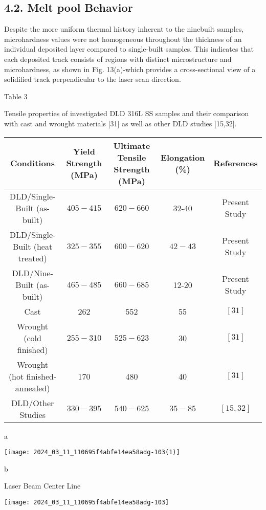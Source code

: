 \documentclass[10pt]{article}
\begin{document}
\subsection*{4.2. Melt pool Behavior}
Despite the more uniform thermal history inherent to the ninebuilt samples, microhardness values were not homogeneous throughout the thickness of an individual deposited layer compared to single-built samples. This indicates that each deposited track consists of regions with distinct microstructure and microhardness, as shown in Fig. 13(a)-which provides a cross-sectional view of a solidified track perpendicular to the laser scan direction.

Table 3

Tensile properties of investigated DLD 316L SS samples and their comparison with cast and wrought materials [31] as well as other DLD studies [15,32].

\begin{center}
\begin{tabular}{|c|c|c|c|c|}
\hline
Conditions & Yield Strength (MPa) & Ultimate Tensile Strength (MPa) & Elongation (\%) & References \\
\hline
DLD/Single-Built (as-built) & $405-415$ & $620-660$ & 32-40 & Present Study \\
\hline
DLD/Single-Built (heat treated) & $325-355$ & $600-620$ & $42-43$ & Present Study \\
\hline
DLD/Nine-Built (as-built) & $465-485$ & $660-685$ & 12-20 & Present Study \\
\hline
Cast & 262 & 552 & 55 & $[31]$ \\
\hline
Wrought (cold finished) & $255-310$ & $525-623$ & 30 & $[31]$ \\
\hline
Wrought (hot finished-annealed) & 170 & 480 & 40 & $[31]$ \\
\hline
DLD/Other Studies & $330-395$ & $540-625$ & $35-85$ & $[15,32]$ \\
\hline
\end{tabular}
\end{center}

a

\begin{center}
\texttt{[image: 2024\_03\_11\_110695f4abfe14ea58adg-103(1)]}
\end{center}

b

Laser Beam Center Line

\begin{center}
\texttt{[image: 2024\_03\_11\_110695f4abfe14ea58adg-103]}
\end{center}
\end{document}
